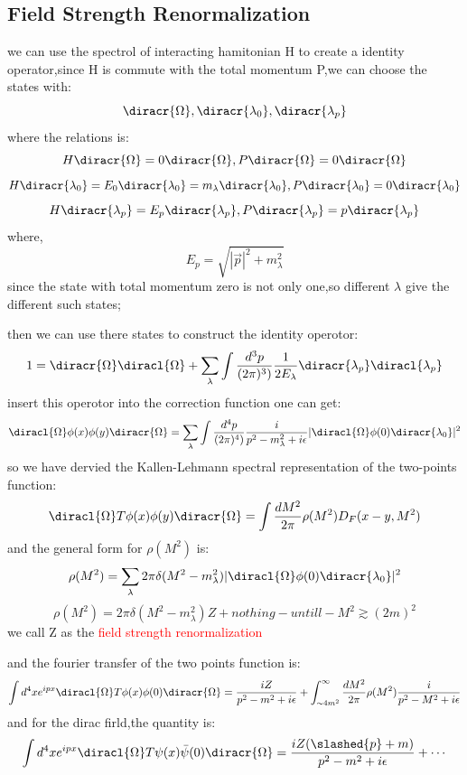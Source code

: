 \subsection{Field Strength Renormalization}
we can use the spectrol of interacting hamitonian H to create a identity operator,since H is commute with the total momentum P,we can choose the states with:
\[\diracr{\Omega},\diracr{\lambda_0},\diracr{\lambda_p}\]
where the relations is:
\[H\diracr{\Omega}=0\diracr{\Omega},P\diracr{\Omega}=0\diracr{\Omega}\]
\[H\diracr{\lambda_0}=E_0\diracr{\lambda_0}=m_\lambda\diracr{\lambda_0},P\diracr{\lambda_0}=0\diracr{\lambda_0}\]
\[H\diracr{\lambda_p}=E_p\diracr{\lambda_p},P\diracr{\lambda_p}=p\diracr{\lambda_p}\]
where,
\[E_p=\sqrt{|\vec{p}|^2+m_\lambda^2}\]
since the state with total momentum zero is not only one,so different $\lambda$ give the different such states;\par
then we can use there states to construct the identity operotor:
\[1=\diracr{\Omega}\diracl{\Omega}+\sum_\lambda\int\frac{d^3p}{(2\pi)^3)}\frac{1}{2E_\lambda}\diracr{\lambda_p}\diracl{\lambda_p}\] 
insert this operotor into the correction function one can get:
\[\diracl{\Omega}\phi(x)\phi(y)\diracr{\Omega}=\sum_\lambda\int\frac{d^4p}{(2\pi)^4)}\frac{i}{p^2-m_\lambda^2+i\epsilon}|\diracl{\Omega}\phi(0)\diracr{\lambda_0}|^2\]
so we have dervied the Kallen-Lehmann spectral representation of the two-points function:
\[\diracl{\Omega}T\phi(x)\phi(y)\diracr{\Omega}=\int \frac{dM^2}{2\pi}\rho(M^2)D_F(x-y,M^2)\]
and the general form for $\rho(M^2)$ is:
\[\rho(M^2)=\sum_{\lambda} 2\pi\delta(M^2-m_\lambda^2)|\diracl{\Omega}\phi(0)\diracr{\lambda_0}|^2\]
\[\rho(M^2)=2\pi\delta(M^2-m_\lambda^2)Z+nothing-untill- M^2\gtrsim (2m)^2\]
we call Z as the \textcolor{red}{field strength renormalization}\par
and the fourier transfer of the two points function is:
\[\int d^4xe^{ipx}\diracl{\Omega}T\phi(x)\phi(0)\diracr{\Omega}=\frac{iZ}{p^2-m^2+i\epsilon}+\int_{\sim 4m^2}^\infty\frac{dM^2}{2\pi}\rho(M^2)\frac{i}{p^2-M^2+i\epsilon}\] 
and for the dirac firld,the quantity is:
\[\int d^4xe^{ipx}\diracl{\Omega}T\psi(x)\bar{\psi}(0)\diracr{\Omega}=\frac{iZ(\slashed{p}+m)}{p^2-m^2+i\epsilon}+\cdots\]
